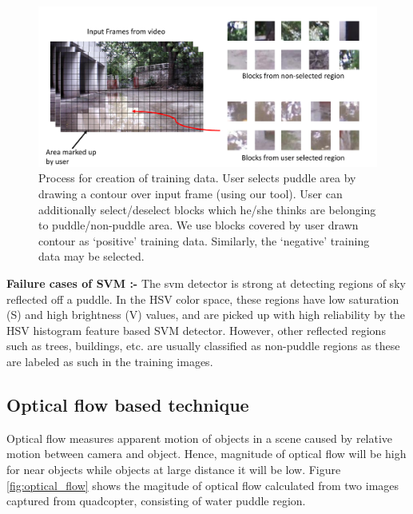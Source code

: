 \documentclass[times,10pt,twocolumn,letterpaper]{article}
\begin{document}
\begin{figure}[h!]
\centering
\includegraphics[width=\linewidth]{images/trainingData.pdf}
\caption{Process for creation of training data. User selects puddle area by
drawing a contour over input frame (using our tool). User can additionally
select/deselect blocks which he/she thinks are belonging to puddle/non-puddle
area. We use blocks covered by user drawn contour as `positive' training data.
Similarly, the `negative' training data may be selected.}
\label{fig:training}
\end{figure}

\textbf{Failure cases of SVM :- }
The svm detector is strong at detecting regions of sky reflected off a puddle.
In the HSV color space, these regions have low saturation (S) and high
brightness (V) values, and are picked up with high reliability by the HSV
histogram feature based SVM detector. However, other reflected regions such as
trees, buildings, etc. are usually classified as non-puddle regions as these
are labeled as such in the training images.

\subsection{Optical flow based technique}
Optical flow measures apparent motion of objects in a scene caused by relative
motion between camera and object. Hence, magnitude of optical flow will be high
for near objects while objects at large distance it will be low. Figure
\ref{fig:optical_flow} shows the magitude of optical flow calculated from two images
captured from quadcopter, consisting of water puddle region. 
\end{document}
